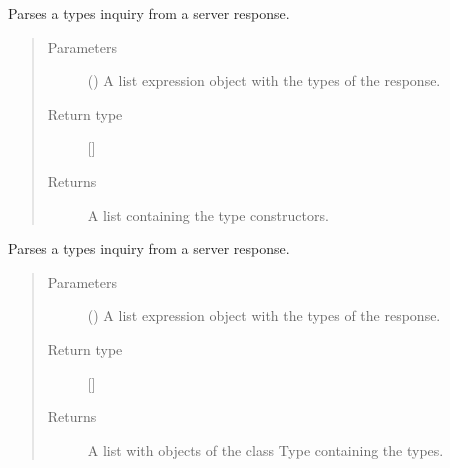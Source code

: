 \documentclass[letterpaper,10pt,english]{sphinxmanual}
\begin{document}

\begin{fulllineitems}
\label{\detokenize{index:secondodb.api.support.secondoparser.parse_inquiry_type_constructors}}
Parses a types inquiry from a  server response.
\begin{quote}\begin{description}
\item[{Parameters}] \leavevmode
{} () \textendash{} A list expression object with the types of the response.

\item[{Return type}] \leavevmode
{[}{]}

\item[{Returns}] \leavevmode
A list containing the type constructors.

\end{description}\end{quote}

\end{fulllineitems}


\begin{fulllineitems}
\label{\detokenize{index:secondodb.api.support.secondoparser.parse_inquiry_types}}
Parses a types inquiry from a  server response.
\begin{quote}\begin{description}
\item[{Parameters}] \leavevmode
{} () \textendash{} A list expression object with the types of the response.

\item[{Return type}] \leavevmode
{[}{]}

\item[{Returns}] \leavevmode
A list with objects of the class Type containing the types.

\end{description}\end{quote}

\end{fulllineitems}
\end{document}
